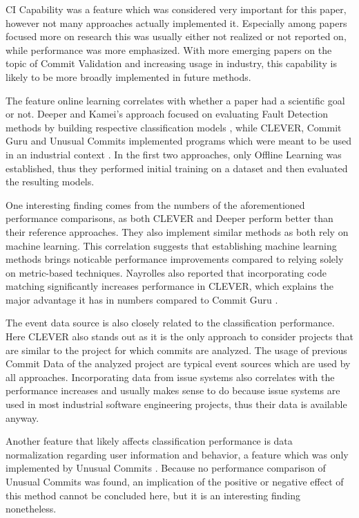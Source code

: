 CI Capability was a feature which was considered very important for this paper, however not many approaches actually implemented it. Especially among papers focused more on research this was usually either not realized or not reported on, while performance was more emphasized. With more emerging papers on the topic of Commit Validation and increasing usage in industry, this capability is likely to be more broadly implemented in future methods.

The feature online learning correlates with whether a paper had a scientific goal or not. Deeper and Kamei's approach focused on evaluating Fault Detection methods by building respective classification models \cite{Yang2015, Kamei2013}, while CLEVER, Commit Guru and Unusual Commits implemented programs which were meant to be used in an industrial context \cite{Nayrolles2018,Rosen2015,Goyal2017}. In the first two approaches, only Offline Learning was established, thus they performed initial training on a dataset and then evaluated the resulting models.

One interesting finding comes from the numbers of the aforementioned performance comparisons, as both CLEVER and Deeper perform better than their reference approaches. They also implement similar methods as both rely on machine learning. This correlation suggests that establishing machine learning methods brings noticable performance improvements compared to relying solely on metric-based techniques. Nayrolles also reported that incorporating code matching significantly increases performance in CLEVER, which explains the major advantage it has in numbers compared to Commit Guru \cite{Nayrolles2018}.

The event data source is also closely related to the classification performance. Here CLEVER also stands out as it is the only approach to consider projects that are similar to the project for which commits are analyzed. The usage of previous Commit Data of the analyzed project are typical event sources which are used by all approaches. Incorporating data from issue systems also correlates with the performance increases and usually makes sense to do because issue systems are used in most industrial software engineering projects, thus their data is available anyway.

Another feature that likely affects classification performance is data normalization regarding user information and behavior, a feature which was only implemented by Unusual Commits \cite{Goyal2017}.
Because no performance comparison of Unusual Commits was found, an implication of the positive or negative effect of this method cannot be concluded here, but it is an interesting finding nonetheless.

